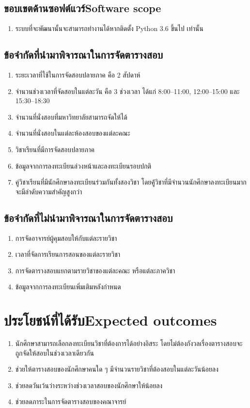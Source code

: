 \subsection{\ifcpe ขอบเขตด้านซอฟต์แวร์\else Software scope\fi}
\begin{enumerate}
    \item ระบบที่จะพัฒนานั้นจะสามารถทำงานได้หากติดตั้ง Python 3.6 ขึ้นไป เท่านั้น 
\end{enumerate}
\subsection{ข้อจำกัดที่นำมาพิจารณาในการจัดตารางสอบ}
\begin{enumerate}
    \item ระยะเวลาที่ใช้ในการจัดสอบปลายภาค คือ 2 สัปดาห์
    \item จำนวนช่วงเวลาที่จัดสอบในแต่ละวัน คือ 3 ช่วงเวลา ได้แก่ 8:00--11:00, 12:00--15:00 
    และ 15:30--18:30
    \item จำนวนที่นั่งสอบที่มหาวิทยาลัยสามารถจัดให้ได้
    \item จำนวนที่นั่งสอบในแต่ละห้องสอบของแต่ละคณะ
    \item วิชาเรียนที่มีการจัดสอบปลายภาค
    \item ข้อมูลจากการลงทะเบียนล่วงหน้าและลงทะเบียนรอบปกติ
    \item คู่วิชาเรียนที่มีนักศึกษาลงทะเบียนร่วมกันทั้งสองวิชา โดยคู้่วิชาที่มีจำนวนนักศึกษาลงทะเบียนมาก จะมีลำดับความสำคัญสูงกว่า
\end{enumerate}

\subsection{ข้อจำกัดที่ไม่นำมาพิจารณาในการจัดตารางสอบ}
\begin{enumerate}
    \item การจัดอาจารย์ผู้คุมสอบให้กับแต่ละรายวิชา
    \item เวลาที่จัดการเรียนการสอนของแต่ละรายวิชา
    \item การจัดตารางสอบแยกตามรายวิชาของแต่ละคณะ หรือแต่ละภาควิชา
    \item ข้อมูลจากการลงทะเบียนเพิ่มเติมหลังกำหนด
\end{enumerate}

\section{\ifcpe ประโยชน์ที่ได้รับ\else Expected outcomes\fi}
\begin{enumerate}
    \item นักศึกษาสามารถเลือกลงทะเบียนวิชาที่ต้องการได้อย่างอิสระ โดยไม่ต้องกังวลเรื่องตารางสอบจะถูกจัดให้สอบในช่วงเวลาเดียวกัน
    \item ช่วยให้ตารางสอบของนักศึกษาคนใด ๆ มีจำนวนรายวิชาที่ต้องสอบในแต่ละวันน้อยลง
    \item ช่วยลดวันเว้นว่างระหว่างช่วงเวลาสอบของนักศึกษาให้น้อยลง
    \item ช่วยลดภาระในการจัดตารางสอบของคณาจารย์ 
\end{enumerate}

